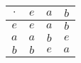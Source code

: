 \documentclass[aspectratio=169]{beamer}
\begin{document}
\begin{wallpaperframe}
\Huge
\begin{tabular}{c|ccc}
$\cdot$ & $e$ & $a$ & $b$ \\ \hline
$e$ & $e$ & $a$ & $b$ \\
$a$ & $a$ & $b$ & $e$ \\
$b$ & $b$ & $e$ & $a$ \\
\end{tabular}
\end{wallpaperframe}
\end{document}
